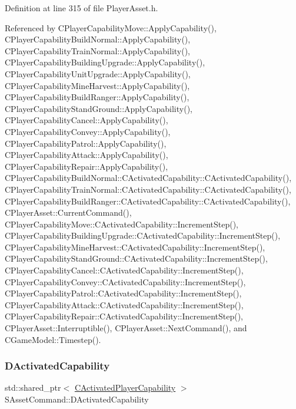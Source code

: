 Definition at line 315 of file Player\+Asset.\+h.



Referenced by C\+Player\+Capability\+Move\+::\+Apply\+Capability(), C\+Player\+Capability\+Build\+Normal\+::\+Apply\+Capability(), C\+Player\+Capability\+Train\+Normal\+::\+Apply\+Capability(), C\+Player\+Capability\+Building\+Upgrade\+::\+Apply\+Capability(), C\+Player\+Capability\+Unit\+Upgrade\+::\+Apply\+Capability(), C\+Player\+Capability\+Mine\+Harvest\+::\+Apply\+Capability(), C\+Player\+Capability\+Build\+Ranger\+::\+Apply\+Capability(), C\+Player\+Capability\+Stand\+Ground\+::\+Apply\+Capability(), C\+Player\+Capability\+Cancel\+::\+Apply\+Capability(), C\+Player\+Capability\+Convey\+::\+Apply\+Capability(), C\+Player\+Capability\+Patrol\+::\+Apply\+Capability(), C\+Player\+Capability\+Attack\+::\+Apply\+Capability(), C\+Player\+Capability\+Repair\+::\+Apply\+Capability(), C\+Player\+Capability\+Build\+Normal\+::\+C\+Activated\+Capability\+::\+C\+Activated\+Capability(), C\+Player\+Capability\+Train\+Normal\+::\+C\+Activated\+Capability\+::\+C\+Activated\+Capability(), C\+Player\+Capability\+Build\+Ranger\+::\+C\+Activated\+Capability\+::\+C\+Activated\+Capability(), C\+Player\+Asset\+::\+Current\+Command(), C\+Player\+Capability\+Move\+::\+C\+Activated\+Capability\+::\+Increment\+Step(), C\+Player\+Capability\+Building\+Upgrade\+::\+C\+Activated\+Capability\+::\+Increment\+Step(), C\+Player\+Capability\+Mine\+Harvest\+::\+C\+Activated\+Capability\+::\+Increment\+Step(), C\+Player\+Capability\+Stand\+Ground\+::\+C\+Activated\+Capability\+::\+Increment\+Step(), C\+Player\+Capability\+Cancel\+::\+C\+Activated\+Capability\+::\+Increment\+Step(), C\+Player\+Capability\+Convey\+::\+C\+Activated\+Capability\+::\+Increment\+Step(), C\+Player\+Capability\+Patrol\+::\+C\+Activated\+Capability\+::\+Increment\+Step(), C\+Player\+Capability\+Attack\+::\+C\+Activated\+Capability\+::\+Increment\+Step(), C\+Player\+Capability\+Repair\+::\+C\+Activated\+Capability\+::\+Increment\+Step(), C\+Player\+Asset\+::\+Interruptible(), C\+Player\+Asset\+::\+Next\+Command(), and C\+Game\+Model\+::\+Timestep().

\hypertarget{structSAssetCommand_ad8beda19520811cc70fe1eab16c774dd}{}\label{structSAssetCommand_ad8beda19520811cc70fe1eab16c774dd} 
\subsubsection{\texorpdfstring{D\+Activated\+Capability}{DActivatedCapability}}
{\footnotesize\ttfamily std\+::shared\+\_\+ptr$<$ \hyperlink{classCActivatedPlayerCapability}{C\+Activated\+Player\+Capability} $>$ S\+Asset\+Command\+::\+D\+Activated\+Capability}



